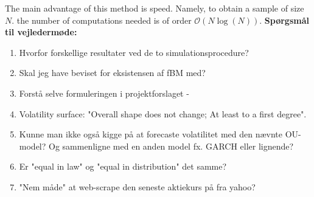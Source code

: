 The main advantage of this method is speed. Namely, to obtain a sample of size $N$. the number of computations needed is of order $\mathcal{O}(N\log(N))$.
\newpage
\textbf{Spørgsmål til vejledermøde:}
\begin{enumerate}
    \item Hvorfor forskellige resultater ved de to simulationsprocedure?
    \item Skal jeg have beviset for eksistensen af fBM med? 
    \item Forstå selve formuleringen i projektforslaget -
    \item Volatility surface: "Overall shape does not change; At least to a first degree".
    \item Kunne man ikke også kigge på at forecaste volatilitet med den nævnte OU-model? Og sammenligne med en anden model fx. GARCH eller lignende? 
    \item Er "equal in law" og "equal in distribution" det samme?
    \item "Nem måde" at web-scrape den seneste aktiekurs på fra yahoo?
\end{enumerate}